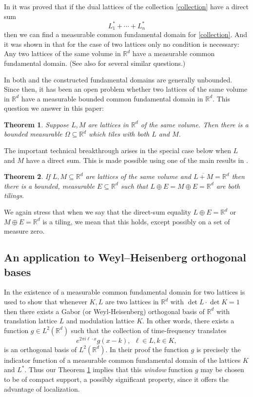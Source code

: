 \documentclass[12pt,a4paper,oneside]{amsart}
\theoremstyle{plain}
\newtheorem{theorem}{Theorem}
\theoremstyle{definition}
\newcommand{\RR}{{\mathbb R}}
\newcounter{rem}
\begin{document}
In \cite{kolountzakis1997multi} it was proved that if the dual lattices of the collection \eqref{collection} have a direct sum
$$
{L_1^*+\cdots+L_n^*
}$$
then we can find a measurable common fundamental domain for \eqref{collection}. And it was shown in \cite{han2001lattice} that for the case of two lattices only no condition is necessary: Any two lattices of the same volume in $\RR^d$ have a measurable common fundamental domain. (See also \cite{kolountzakis2022functions} for several similar questions.)

In both \cite{kolountzakis1997multi} and \cite{han2001lattice} the constructed fundamental domains are generally unbounded. Since then, it has been an open problem whether two lattices of the same volume in $\RR^d$ have a measurable bounded common fundamental domain in $\RR^d$. This question we answer in this paper:
 
\begin{theorem}\label{th:main}
Suppose $L,M$ are lattices in $\RR^d$ of the same volume.
Then there is a bounded measurable $\Omega \subseteq \RR^d$ which tiles with both $L$ and $M$.
\end{theorem}

The important technical breakthrough arises in the special case below when $L$ and $M$ have a direct sum. This is made possible using one of the main results in \cite{EGKL2025}.

\begin{theorem}\label{th:dense}
If $L, M \subseteq \RR^d$ are lattices of the same volume and $\overline{L+M}=\RR^d$ then there is a bounded, measurable $E \subseteq \RR^d$ such that $L \oplus E = M \oplus E = \RR^d$ are both tilings. 
\end{theorem}
We again stress that when we say that the direct-sum equality $L \oplus E = \RR^d$ or $M \oplus E = \RR^d$ is a tiling, we mean that this holds, except possibly on a set of measure zero.

\subsection{An application to Weyl--Heisenberg orthogonal bases}\label{ss:gabor}

In \cite{han2001lattice} the existence of a measurable common fundamental domain for two lattices is used to show that whenever $K, L$ are two lattices in $\RR^d$ with $\det L \cdot \det K = 1$ then there exists a Gabor (or Weyl-Heisenberg) orthogonal basis of $\RR^d$ with translation lattice $L$ and modulation lattice $K$. In other words, there exists a function $g \in L^2(\RR^d)$ such that the collection of time-frequency translates
$$
e^{2\pi i \ell \cdot x} g(x-k),\ \ \ell \in L, k \in K,
$$
is an orthogonal basis of $L^2(\RR^d)$. In their proof the function $g$ is precisely the indicator function of a measurable common fundamental domain of the lattices $K$ and $L^*$. Thus our Theorem \ref{th:main} implies that this \textit{window} function $g$ may be chosen to be of compact support, a possibly significant property, since it offers the advantage of localization.
\end{document}
